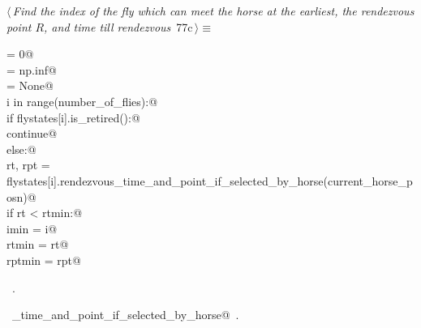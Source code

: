 \documentclass[11.5pt]{report}
\begin{document}
\begin{flushleft} \small
\begin{minipage}{\linewidth}\label{scrap116}\raggedright\small
{} $\langle\,${\itshape Find the index of the fly  which can meet the horse at the earliest, the rendezvous point $R$, and time till rendezvous}\nobreak\ {\footnotesize {77c}}$\,\rangle\equiv$
\vspace{-1ex}
\begin{list}{}{} \item
\mbox{}\verb@imin  = 0@\\
\mbox{}\verb@rtmin = np.inf@\\
\mbox{}\verb@rptmin= None@\\
\mbox{}\verb@for i in range(number_of_flies):@\\
\mbox{}\verb@     if flystates[i].is_retired():@\\
\mbox{}\verb@         continue@\\
\mbox{}\verb@     else:@\\
\mbox{}\verb@         rt, rpt = flystates[i].rendezvous_time_and_point_if_selected_by_horse(current_horse_posn)@\\
\mbox{}\verb@         if rt < rtmin:@\\
\mbox{}\verb@             imin   = i@\\
\mbox{}\verb@             rtmin  = rt@\\
\mbox{}\verb@             rptmin = rpt@\\
\mbox{}\verb@@{\NWsep}
\end{list}
\vspace{-1.5ex}
\footnotesize
\begin{list}{}{\setlength{\itemsep}{-\parsep}\setlength{\itemindent}{-\leftmargin}}
\item \NWtxtMacroRefIn\ .
\item \NWtxtIdentsUsed\nobreak\  \verb@rendezvous_time_and_point_if_selected_by_horse@\nobreak\ .
\item{}
\end{list}
\end{minipage}\vspace{4ex}
\end{flushleft}
\end{document}
